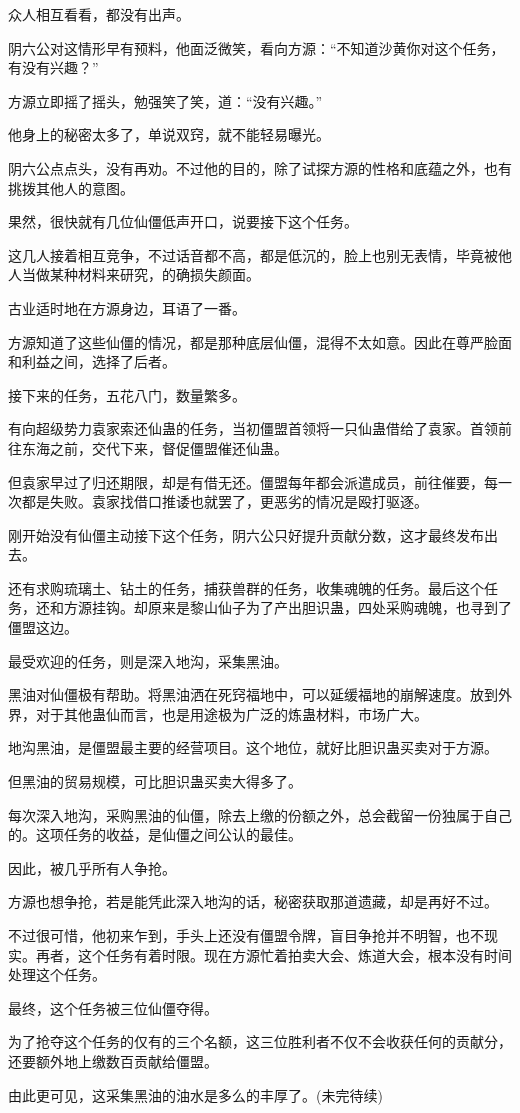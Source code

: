 \begin{this_body}
众人相互看看，都没有出声。

阴六公对这情形早有预料，他面泛微笑，看向方源：“不知道沙黄你对这个任务，有没有兴趣？”

方源立即摇了摇头，勉强笑了笑，道：“没有兴趣。”

他身上的秘密太多了，单说双窍，就不能轻易曝光。

阴六公点点头，没有再劝。不过他的目的，除了试探方源的性格和底蕴之外，也有挑拨其他人的意图。

果然，很快就有几位仙僵低声开口，说要接下这个任务。

这几人接着相互竞争，不过话音都不高，都是低沉的，脸上也别无表情，毕竟被他人当做某种材料来研究，的确损失颜面。

古业适时地在方源身边，耳语了一番。

方源知道了这些仙僵的情况，都是那种底层仙僵，混得不太如意。因此在尊严脸面和利益之间，选择了后者。

接下来的任务，五花八门，数量繁多。

有向超级势力袁家索还仙蛊的任务，当初僵盟首领将一只仙蛊借给了袁家。首领前往东海之前，交代下来，督促僵盟催还仙蛊。

但袁家早过了归还期限，却是有借无还。僵盟每年都会派遣成员，前往催要，每一次都是失败。袁家找借口推诿也就罢了，更恶劣的情况是殴打驱逐。

刚开始没有仙僵主动接下这个任务，阴六公只好提升贡献分数，这才最终发布出去。

还有求购琉璃土、钻土的任务，捕获兽群的任务，收集魂魄的任务。最后这个任务，还和方源挂钩。却原来是黎山仙子为了产出胆识蛊，四处采购魂魄，也寻到了僵盟这边。

最受欢迎的任务，则是深入地沟，采集黑油。

黑油对仙僵极有帮助。将黑油洒在死窍福地中，可以延缓福地的崩解速度。放到外界，对于其他蛊仙而言，也是用途极为广泛的炼蛊材料，市场广大。

地沟黑油，是僵盟最主要的经营项目。这个地位，就好比胆识蛊买卖对于方源。

但黑油的贸易规模，可比胆识蛊买卖大得多了。

每次深入地沟，采购黑油的仙僵，除去上缴的份额之外，总会截留一份独属于自己的。这项任务的收益，是仙僵之间公认的最佳。

因此，被几乎所有人争抢。

方源也想争抢，若是能凭此深入地沟的话，秘密获取那道遗藏，却是再好不过。

不过很可惜，他初来乍到，手头上还没有僵盟令牌，盲目争抢并不明智，也不现实。再者，这个任务有着时限。现在方源忙着拍卖大会、炼道大会，根本没有时间处理这个任务。

最终，这个任务被三位仙僵夺得。

为了抢夺这个任务的仅有的三个名额，这三位胜利者不仅不会收获任何的贡献分，还要额外地上缴数百贡献给僵盟。

由此更可见，这采集黑油的油水是多么的丰厚了。(未完待续)

\end{this_body}

